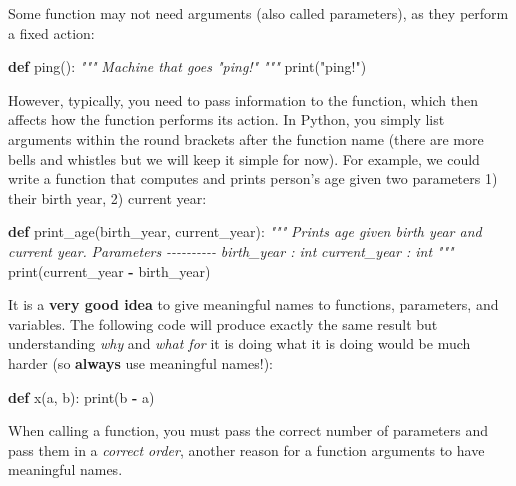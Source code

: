 \documentclass[
]{book}
\newenvironment{Shaded}{\begin{snugshade}}{\end{snugshade}}
\newcommand{\BuiltInTok}[1]{#1}
\newcommand{\CommentTok}[1]{\textcolor[rgb]{0.56,0.35,0.01}{\textit{#1}}}
\newcommand{\KeywordTok}[1]{\textcolor[rgb]{0.13,0.29,0.53}{\textbf{#1}}}
\newcommand{\NormalTok}[1]{#1}
\newcommand{\OperatorTok}[1]{\textcolor[rgb]{0.81,0.36,0.00}{\textbf{#1}}}
\newcommand{\StringTok}[1]{\textcolor[rgb]{0.31,0.60,0.02}{#1}}
\begin{document}
Some function may not need arguments (also called parameters), as they perform a fixed action:

\begin{Shaded}
\begin{Highlighting}[]
\KeywordTok{def}\NormalTok{ ping():}
    \CommentTok{"""}
\CommentTok{    Machine that goes "ping!"}
\CommentTok{    """}
    \BuiltInTok{print}\NormalTok{(}\StringTok{"ping!"}\NormalTok{)}
\end{Highlighting}
\end{Shaded}

However, typically, you need to pass information to the function, which then affects how the function performs its action. In Python, you simply list arguments within the round brackets after the function name (there are more bells and whistles but we will keep it simple for now). For example, we could write a function that computes and prints person's age given two parameters 1) their birth year, 2) current year:

\begin{Shaded}
\begin{Highlighting}[]
\KeywordTok{def}\NormalTok{ print\_age(birth\_year, current\_year):}
    \CommentTok{"""}
\CommentTok{    Prints age given birth year and current year.}
\CommentTok{    }
\CommentTok{    Parameters}
\CommentTok{    {-}{-}{-}{-}{-}{-}{-}{-}{-}{-}}
\CommentTok{    birth\_year : int}
\CommentTok{    current\_year : int}
\CommentTok{    """}
    \BuiltInTok{print}\NormalTok{(current\_year }\OperatorTok{{-}}\NormalTok{ birth\_year)}
\end{Highlighting}
\end{Shaded}

It is a \textbf{very good idea} to give meaningful names to functions, parameters, and variables. The following code will produce exactly the same result but understanding \emph{why} and \emph{what for} it is doing what it is doing would be much harder (so \textbf{always} use meaningful names!):

\begin{Shaded}
\begin{Highlighting}[]
\KeywordTok{def}\NormalTok{ x(a, b):}
    \BuiltInTok{print}\NormalTok{(b }\OperatorTok{{-}}\NormalTok{ a)}
\end{Highlighting}
\end{Shaded}

When calling a function, you must pass the correct number of parameters and pass them in a \emph{correct order}, another reason for a function arguments to have meaningful names.
\end{document}

